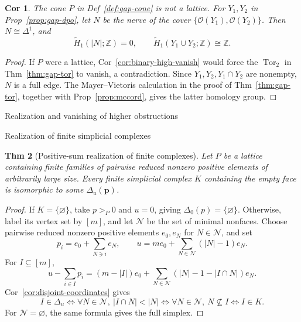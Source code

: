 \documentclass[10pt,letterpaper]{amsart}
\makeatletter
\numberwithin{equation}{section}
\newtheorem{thm}{Thm}[section]
\newtheorem{cor}[thm]{Cor}
\theoremstyle{definition}
\newcommand{\Z}{\mathbb Z}
\newcommand{\Tor}{\operatorname{Tor}}
\newcommand{\ord}{\mathcal O}
\def\section{\@startsection{section}{1}
  \z@{1.1\linespacing\@plus.5\linespacing}{.6\linespacing}
  {\normalfont\fontsize{13}{16}\selectfont\bfseries\boldmath\centering}}
\def\subsection{\@startsection{subsection}{2}
  \z@{.9\linespacing\@plus.3\linespacing}{.4\linespacing}
  {\normalfont\fontsize{11.5}{14}\selectfont\bfseries\boldmath\raggedright}}
\makeatother
\begin{document}
\begin{cor}\label{cor:gap-not-lattice}
The cone $P$ in Def~\ref{def:gap-cone} is not a lattice. For $Y_1,Y_2$ in Prop~\ref{prop:gap-dpo}, let $N$ be the nerve of the cover $\{\ord(Y_1),\ord(Y_2)\}$. Then $N\cong\Delta^1$, and
\[
\widetilde H_1(|N|;\Z)=0,\qquad
\widetilde H_1(Y_1\cup Y_2;\Z)\cong\Z.
\]
\end{cor}
\begin{proof}
If $P$ were a lattice, Cor~\ref{cor:binary-high-vanish} would force the $\Tor_2$ in Thm~\ref{thm:gap-tor} to vanish, a contradiction. Since $Y_1,Y_2,Y_1\cap Y_2$ are nonempty, $N$ is a full edge. The Mayer--Vietoris calculation in the proof of Thm~\ref{thm:gap-tor}, together with Prop~\ref{prop:mccord}, gives the latter homology group.
\end{proof}

\section{Realization and vanishing of higher obstructions}
\subsection{Realization of finite simplicial complexes}
\begin{thm}[Positive-sum realization of finite complexes]\label{thm:realization}
Let $P$ be a lattice containing finite families of pairwise reduced nonzero positive elements of arbitrarily large size. Every finite simplicial complex $K$ containing the empty face is isomorphic to some $\Delta_u(\mathbf p)$.
\end{thm}
\begin{proof}
If $K=\{\varnothing\}$, take $p>_P0$ and $u=0$, giving $\Delta_0(p)=\{\varnothing\}$.
Otherwise, label its vertex set by $[m]$, and let $\mathcal N$ be the set of minimal nonfaces. Choose pairwise reduced nonzero positive elements $e_0,e_N$ for $N\in\mathcal N$, and set
\[
p_i=e_0+\sum_{N\ni i}e_N,\qquad
u=me_0+\sum_{N\in\mathcal N}(|N|-1)e_N.
\]
For $I\subseteq[m]$,
\[
u-\sum_{i\in I}p_i
=(m-|I|)e_0+\sum_{N\in\mathcal N}(|N|-1-|I\cap N|)e_N.
\]
Cor~\ref{cor:disjoint-coordinates} gives
\[
I\in\Delta_u\iff\forall N\in\mathcal N,\ |I\cap N|<|N|
\iff\forall N\in\mathcal N,\ N\not\subseteq I\iff I\in K.
\]
For $\mathcal N=\varnothing$, the same formula gives the full simplex.
\end{proof}
\end{document}
